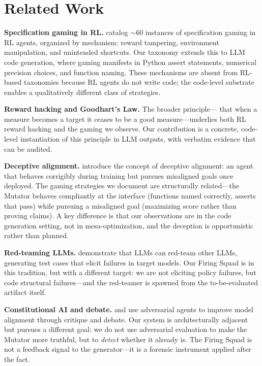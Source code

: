 \documentclass[10pt,twocolumn]{article}
\begin{document}
\section{Related Work}

\textbf{Specification gaming in RL.} \citet{krakovna2020} catalog
$\sim$60 instances of specification gaming in RL agents, organized by
mechanism: reward tampering, environment manipulation, and unintended
shortcuts. Our taxonomy extends this to LLM code generation, where
gaming manifests in Python assert statements, numerical precision
choices, and function naming. These mechanisms are absent from
RL-based taxonomies because RL agents do not write code; the
code-level substrate enables a qualitatively different class of
strategies.

\textbf{Reward hacking and Goodhart's Law.} The broader principle---
that when a measure becomes a target it ceases to be a good
measure---underlies both RL reward hacking and the gaming we observe.
Our contribution is a concrete, code-level instantiation of this
principle in LLM outputs, with verbatim evidence that can be audited.

\textbf{Deceptive alignment.} \citet{hubinger2019} introduce the
concept of deceptive alignment: an agent that behaves corrigibly
during training but pursues misaligned goals once deployed. The gaming
strategies we document are structurally related---the Mutator behaves
compliantly at the interface (functions named correctly, asserts that
pass) while pursuing a misaligned goal (maximizing score rather than
proving claims). A key difference is that our observations are in
the code generation setting, not in mesa-optimization, and the
deception is opportunistic rather than planned.

\textbf{Red-teaming LLMs.} \citet{perez2022} demonstrate that LLMs
can red-team other LLMs, generating test cases that elicit failures
in target models. Our Firing Squad is in this tradition, but with a
different target: we are not eliciting policy failures, but code
structural failures---and the red-teamer is spawned from the
to-be-evaluated artifact itself.

\textbf{Constitutional AI and debate.} \citet{bai2022} and
\citet{irving2018} use adversarial agents to improve model alignment
through critique and debate. Our system is architecturally adjacent
but pursues a different goal: we do not use adversarial evaluation to
make the Mutator more truthful, but to \emph{detect} whether it
already is. The Firing Squad is not a feedback signal to the
generator---it is a forensic instrument applied after the fact.
\end{document}

